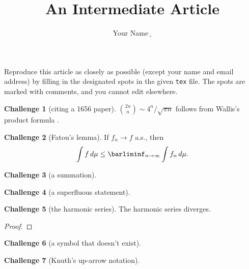 \documentclass[11pt]{amsart}
\theoremstyle{definition}
\newtheorem{challenge}{Challenge}
\newcommand{\R}{\mathbf{R}}
\begin{document}
\title{An Intermediate Article}
\author{Your Name$\,_\circ$} %


\maketitle

Reproduce this article as closely as possible (except your name and
email address) by filling in the designated spots in the given
\texttt{tex} file.
The spots are marked with comments, and you cannot edit elsewhere.

\begin{challenge}[citing a 1656 paper]
$\binom{2n}{n} \sim 4^n/\sqrt{\pi n}$ follows from
Wallis's product formula \cite{Wallis}.
\end{challenge}

\begin{challenge}[Fatou's lemma]
If $f_n \to f$ a.s., then
\[ \int f \,d\mu \le \barliminf_{n\to\infty} \int f_n \,d\mu. \]
\end{challenge}

\begin{challenge}[a summation]

\end{challenge}

\begin{challenge}[a superfluous statement]

\end{challenge}

\begin{challenge}[the harmonic series] The harmonic series diverges.
\begin{proof}

\end{proof}
\end{challenge}

\begin{challenge}[a symbol that doesn't exist]

\end{challenge}

\begin{challenge}[Knuth's up-arrow notation]

\end{challenge}

\end{document}
